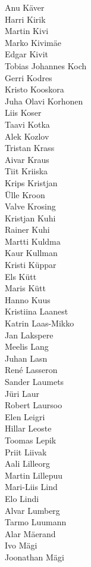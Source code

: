 \begin{multicols}{3}
Anu Käver\\
Harri Kirik\\
Martin Kivi\\
Marko Kivimäe\\
Edgar Kivit\\
Tobias Johannes Koch\\
Gerri Kodres\\
Kristo Kooskora\\
Juha Olavi Korhonen\\
Liis Koser\\
Taavi Kotka\\
Alek Kozlov\\
Tristan Krass\\
Aivar Kraus\\
Tiit Kriiska\\
Krips Kristjan\\
Ülle Kroon\\
Valve Krosing\\
Kristjan Kuhi\\
Rainer Kuhi\\
Martti Kuldma\\
Kaur Kullman\\
Kristi Küppar\\
Els Kütt\\
Maris Kütt\\
Hanno Kuus\\
Kristiina Laanest\\
Katrin Laas-Mikko\\
Jan Lakspere\\
Meelis Lang\\
Juhan Lasn\\
René Lasseron\\
Sander Laumets\\
Jüri Laur\\
Robert Laursoo\\
Elen Leigri\\
Hillar Leoste\\
Toomas Lepik\\
Priit Liivak\\
Aali Lilleorg\\
Martin Lillepuu\\
Mari-Liis Lind\\
Elo Lindi\\
Alvar Lumberg\\
Tarmo Luumann\\
Alar Mäerand\\
Ivo Mägi\\
Joonathan Mägi\\

\end{multicols}
